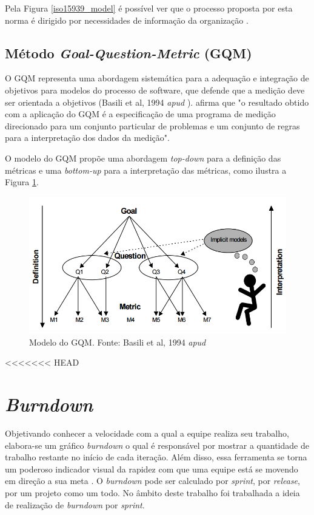       Pela Figura \ref{iso15939_model} é possível ver que o processo proposta por esta norma é dirigido por
      necessidades de informação da organização \cite{iso15939}.

  \subsection{Método \textit{Goal-Question-Metric} (GQM)}
  \label{gqm}
  
    O GQM representa uma abordagem sistemática para a adequação e integração de objetivos para modelos do processo de software,
    que defende que a medição deve ser orientada a objetivos (Basili et al, 1994 \textit{apud} \cite{solingen99}). 
     afirma que "o resultado obtido com a aplicação do GQM é a especificação de uma programa
    de medição direcionado para um conjunto particular de problemas e um conjunto de regras para a interpretação dos dados da medição".
    
    O modelo do GQM propõe uma abordagem \textit{top-down} para a definição das métricas e uma \textit{bottom-up} para a interpretação
    das métricas, como ilustra a Figura \ref{gqm_model}.
    
    \begin{figure}[!htb]
      \centering
      \includegraphics[scale=0.5]{figuras/gqm_model}
      \caption[Modelo do GQM.]
	      {Modelo do GQM. Fonte: Basili et al, 1994 \textit{apud} \cite{solingen99}}
      \label{gqm_model}
    \end{figure}
<<<<<<< HEAD

  \section{\textit{Burndown}}

    Objetivando conhecer a velocidade com a qual a equipe realiza seu trabalho, elabora-se um gráfico \textit{burndown} o qual é responsável por mostrar a quantidade de trabalho restante no início de cada iteração. Além disso, essa ferramenta se torna um poderoso indicador visual da rapidez com que uma equipe está se movendo em direção a sua meta \cite{cohn06}. O \textit{burndown} pode ser calculado por \textit{sprint}, por \textit{release}, por um projeto como um todo. No âmbito deste trabalho foi trabalhada a ideia de realização de \textit{burndown} por \textit{sprint}.

